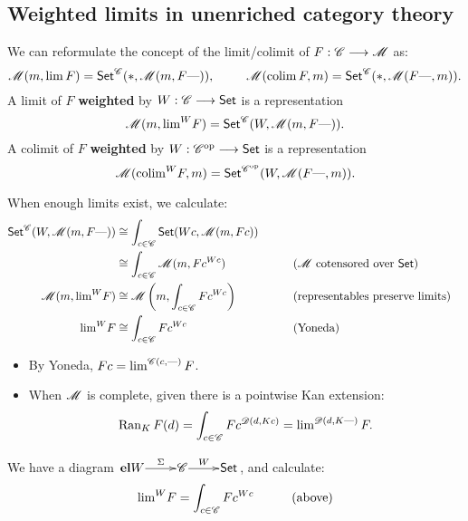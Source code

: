 \documentclass[11pt]{article}
\begin{document}
\subsection*{Weighted limits in unenriched category theory}
\begin{itemise}
\setlength{\parindent}{.25in}
\item We can reformulate the concept of the limit/colimit of $F:\mathscr{C}\longrightarrow\mathscr{M}$ as:
\[\mathscr{M}(m,\operatorname*{lim} F)=\operatorname{{\mathsf{Set}}}^{\mathscr{C}}(*,\mathscr{M}(m,F\textup{---} )),\ \qquad \,\mathscr{M}(\operatorname*{colim} F,m)=\operatorname{{\mathsf{Set}}}^{\mathscr{C}}(*,\mathscr{M}(F\textup{---},m )).\]
A limit of $F$ \textbf{weighted} by $W:\mathscr{C}\longrightarrow\operatorname{{\mathsf{Set}}}$ is a representation
\[\mathscr{M}(m,\textstyle\operatorname*{lim}^W\! F)=\operatorname{{\mathsf{Set}}}^{\mathscr{C}}(W,\mathscr{M}(m,F\textup{---} )).\]
A colimit of $F$ \textbf{weighted} by $W:\mathscr{C}^{\textup{op}}\longrightarrow\operatorname{{\mathsf{Set}}}$ is a representation
\[\mathscr{M}(\textstyle\operatorname*{colim}^W\! F,m)=\operatorname{{\mathsf{Set}}}^{\mathscr{C}^{\textup{op}}}(W,\mathscr{M}(F\textup{---},m )).\]
\item When enough limits exist, we calculate:
\begin{alignat*}{2}
\Set^\scrc(W,\scrm(m,F\DASH )) 
&\cong
\int_{c\in\scrc}\Set(Wc,\scrm(m,Fc))%
\\
&\cong
\int_{c\in\scrc}\scrm(m,Fc^{Wc})%
&\qquad&\text{($\scrm$ cotensored over $\Set$)}\\
\scrm(m,\textstyle\limit^W\! F)
&\cong
\scrm\left(m,\int_{c\in\scrc}Fc^{Wc}\right)%
&\qquad&\text{(representables preserve limits)}\\
\textstyle\limit^W\! F
&\cong
\int_{c\in\scrc}Fc^{Wc}%
&\qquad&\text{(Yoneda)}
\end{alignat*}
\begin{itemize}\squishlist
\setlength{\parindent}{.25in}
\item By Yoneda, $Fc=\operatorname*{lim}^{\mathscr{C}(c,\textup{---} )}F$.
\item When $\mathscr{M}$ is complete, given 
 there is a pointwise Kan extension:
\[\operatorname{Ran}_KF(d)=\int_{c\in\mathscr{C}} Fc^{\mathscr{D}(d,Kc)}= \textstyle\operatorname*{lim}^{\mathscr{D}(d,K\textup{---} )}F.\]
\end{itemize}
\item We have a diagram 
${\xymatrix@1{
\textbf{el}W
\ar[r]^-{\Sigma}
&%
\scrc
\ar[r]^-{W}
&%
\Set%
}}$, and calculate:
\begin{alignat*}{2}
\textstyle\limit^W\!F
&=
\int_{c\in\scrc}Fc^{Wc}%
&\qquad&\text{(above)}\\

\end{alignat*}
\end{itemise}
\end{document}
